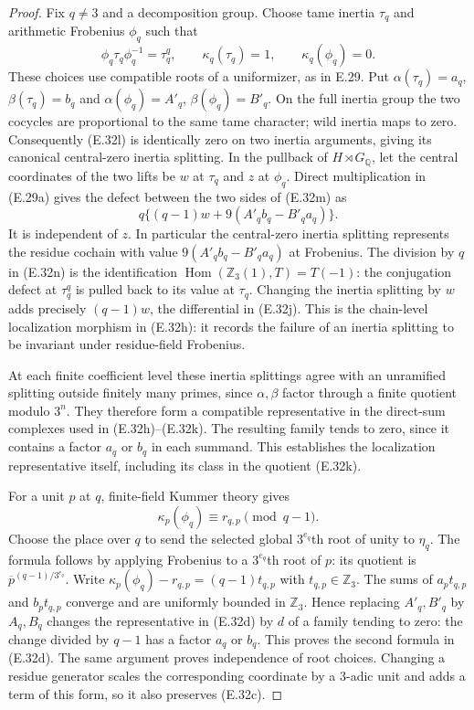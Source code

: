 \begin{proof}
Fix $q\ne3$ and a decomposition group. Choose tame inertia
$\tau_q$ and arithmetic Frobenius $\phi_q$ such that
\[
 \phi_q\tau_q\phi_q^{-1}=\tau_q^q,
 \qquad \kappa_q(\tau_q)=1,
 \qquad \kappa_q(\phi_q)=0.                                 \tag{E.32m}
\]
These choices use compatible roots of a uniformizer, as in
E.29. Put
$\alpha(\tau_q)=a_q$, $\beta(\tau_q)=b_q$ and
$\alpha(\phi_q)=A'_q$, $\beta(\phi_q)=B'_q$.
On the full inertia group the two cocycles are proportional
to the same tame character; wild inertia maps to zero.
Consequently (E.32l) is identically zero on two inertia
arguments, giving its canonical central-zero inertia splitting.
In the pullback of $H\rtimes G_{\mathbb Q}$, let the central
coordinates of the two lifts be $w$ at $\tau_q$ and $z$ at
$\phi_q$. Direct multiplication in (E.29a) gives the defect
between the two sides of (E.32m) as
\[
 q\{(q-1)w+9(A'_qb_q-B'_qa_q)\}.                            \tag{E.32n}
\]
It is independent of $z$. In particular the central-zero
inertia splitting represents the residue cochain with value
$9(A'_qb_q-B'_qa_q)$ at Frobenius. The division by $q$ in
(E.32n) is the identification
$\operatorname{Hom}(\mathbb Z_3(1),T)=T(-1)$:
the conjugation defect at $\tau_q^q$ is pulled back to its
value at $\tau_q$. Changing the inertia splitting by $w$
adds precisely $(q-1)w$, the differential in (E.32j).
This is the chain-level localization morphism in (E.32h):
it records the failure of an inertia splitting to be invariant
under residue-field Frobenius.

At each finite coefficient level these inertia splittings
agree with an unramified splitting outside finitely many
primes, since $\alpha,\beta$ factor through a finite quotient
modulo $3^n$. They therefore form a compatible representative
in the direct-sum complexes used in (E.32h)--(E.32k).
The resulting family tends to zero, since it contains a
factor $a_q$ or $b_q$ in each summand.
This establishes the localization representative itself,
including its class in the quotient (E.32k).

For a unit $p$ at $q$, finite-field Kummer theory gives
\[
 \kappa_p(\phi_q)\equiv r_{q,p}\pmod{q-1}.
\]
Choose the place over $q$ to send the selected global
$3^{e_q}$th root of unity to $\eta_q$.
The formula follows by applying Frobenius to a
$3^{e_q}$th root of $p$: its quotient is
$\overline p^{(q-1)/3^{e_q}}$.
Write
$\kappa_p(\phi_q)-r_{q,p}=(q-1)t_{q,p}$ with
$t_{q,p}\in\mathbb Z_3$.
The sums of $a_pt_{q,p}$ and $b_pt_{q,p}$ converge and are
uniformly bounded in $\mathbb Z_3$.
Hence replacing $A'_q,B'_q$ by $A_q,B_q$ changes the
representative in (E.32d) by $d$ of a family tending to zero:
the change divided by $q-1$ has a factor $a_q$ or $b_q$.
This proves the second formula in (E.32d).
The same argument proves independence of root choices.
Changing a residue generator scales the corresponding
coordinate by a $3$-adic unit and adds a term of this form,
so it also preserves (E.32c).


\end{proof}
